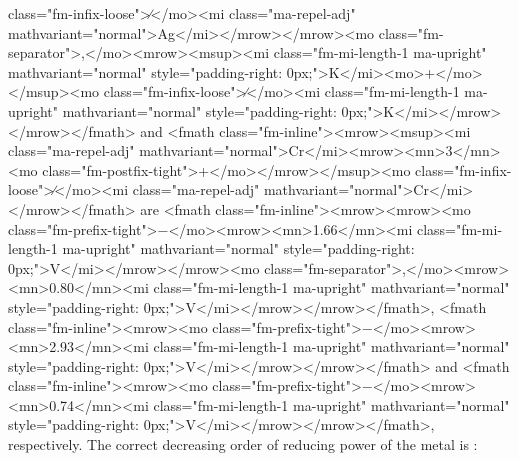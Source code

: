 \documentclass{article}
\begin{document}
class="fm-infix-loose">∕</mo><mi class="ma-repel-adj" mathvariant="normal">Ag</mi></mrow></mrow><mo class="fm-separator">,</mo><mrow><msup><mi class="fm-mi-length-1 ma-upright" mathvariant="normal" style="padding-right: 0px;">K</mi><mo>+</mo></msup><mo class="fm-infix-loose">∕</mo><mi class="fm-mi-length-1 ma-upright" mathvariant="normal" style="padding-right: 0px;">K</mi></mrow></mrow></fmath> and <fmath class="fm-inline"><mrow><msup><mi class="ma-repel-adj" mathvariant="normal">Cr</mi><mrow><mn>3</mn><mo class="fm-postfix-tight">+</mo></mrow></msup><mo class="fm-infix-loose">∕</mo><mi class="ma-repel-adj" mathvariant="normal">Cr</mi></mrow></fmath> are <fmath class="fm-inline"><mrow><mrow><mo class="fm-prefix-tight">−</mo><mrow><mn>1.66</mn><mi class="fm-mi-length-1 ma-upright" mathvariant="normal" style="padding-right: 0px;">V</mi></mrow></mrow><mo class="fm-separator">,</mo><mrow><mn>0.80</mn><mi class="fm-mi-length-1 ma-upright" mathvariant="normal" style="padding-right: 0px;">V</mi></mrow></mrow></fmath>, <fmath class="fm-inline"><mrow><mo class="fm-prefix-tight">−</mo><mrow><mn>2.93</mn><mi class="fm-mi-length-1 ma-upright" mathvariant="normal" style="padding-right: 0px;">V</mi></mrow></mrow></fmath> and <fmath class="fm-inline"><mrow><mo class="fm-prefix-tight">−</mo><mrow><mn>0.74</mn><mi class="fm-mi-length-1 ma-upright" mathvariant="normal" style="padding-right: 0px;">V</mi></mrow></mrow></fmath>, respectively. The correct decreasing order of reducing power of the metal is :\newline 
\end{document}
